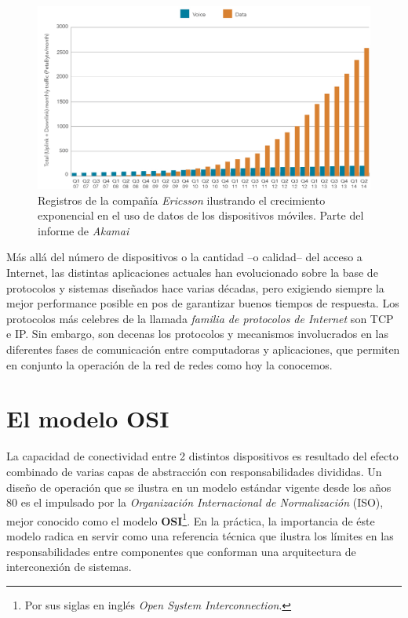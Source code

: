\begin{intro}
\begin{figure}[!h]
	\centering
	\includegraphics[scale=0.5]{imagenes/conexiones_moviles}
	\caption{Registros de la compañía \emph{Ericsson} ilustrando el crecimiento exponencial en el uso de datos de los dispositivos móviles. Parte del informe de \emph{Akamai} \cite{report:akamai}}
	\label{fig:akamai_stats}
\end{figure}

Más allá del número de dispositivos o la cantidad --o calidad-- del acceso a Internet, las distintas aplicaciones actuales han evolucionado sobre la base de protocolos y sistemas diseñados hace varias décadas, pero exigiendo siempre la mejor performance posible en pos de garantizar buenos tiempos de respuesta. Los protocolos más celebres de la llamada \emph{familia de protocolos de Internet} son TCP e IP. Sin embargo, son decenas los protocolos y mecanismos involucrados en las diferentes fases de comunicación entre computadoras y aplicaciones, que permiten en conjunto la operación de la red de redes como hoy la conocemos.

\section*{El modelo OSI}
La capacidad de conectividad entre 2 distintos dispositivos es resultado del efecto combinado de varias capas de abstracción con responsabilidades divididas. Un diseño de operación que se ilustra en un modelo estándar vigente desde los años 80 es el impulsado por la \emph{Organización Internacional de Normalización} (ISO), mejor conocido como el modelo \textbf{OSI}\footnote{Por sus siglas en inglés \emph{Open System Interconnection}.}. En la práctica, la importancia de éste modelo radica en servir como una referencia técnica que ilustra los límites en las responsabilidades entre componentes que conforman una arquitectura de interconexión de sistemas.


\end{intro}
